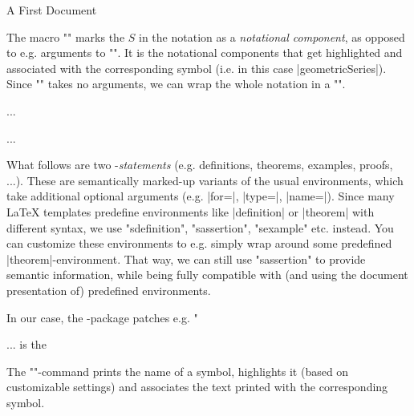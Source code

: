 \begin{sfragment}{A First \sTeX Document}
    \begin{function}{\comp}
      The macro \stexcode"\comp" marks the $S$ in the notation as a
      \emph{notational component}, as opposed to e.g. arguments
      to \stexcode"\geometricSeries".
      It is the notational components that get highlighted
      and associated with the corresponding symbol (i.e. in this
      case |geometricSeries|). Since \stexcode"\geometricSeries" takes
      no arguments, we can wrap the whole notation in a \stexcode"\comp".
    \end{function}\bigskip

    \begin{latexcode}[numbers=none,aboveskip=0pt,belowskip=0pt,gobble=8]
        \begin{sdefinition}[for=geometricSeries]
        ...
        \end{sdefinition}
        \begin{sassertion}[name=geometricSeriesConverges,type=theorem]
        ...
        \end{sassertion}
    \end{latexcode}
    What follows are two \sTeX-\emph{statements} (e.g. definitions,
    theorems, examples, proofs, ...). These are semantically marked-up
    variants of the usual environments, which take additional optional
    arguments (e.g. |for=|, |type=|, |name=|). Since many \LaTeX\xspace templates
    predefine environments like |definition| or |theorem| with
    different syntax, we use \stexcode"sdefinition", 
    \stexcode"sassertion", \stexcode"sexample"
    etc. instead. You can customize these environments to e.g.
    simply wrap around some predefined |theorem|-environment.
    That way, we can still use \stexcode"sassertion" to provide semantic
    information, while being fully compatible with (and using
    the document presentation of) predefined environments.

    In our case, the -package patches
    e.g. \stexcode"\fi

    \begin{function}{\symname}
      \begin{latexcode}[numbers=none,aboveskip=0pt,belowskip=0pt,gobble=6]
        ... is the 
      \end{latexcode}
      The \stexcode"\symname"-command prints the name of a symbol,
      highlights it (based on customizable settings)
      and associates the text printed with the corresponding
      symbol.
      

\end{function}
\end{sfragment}
